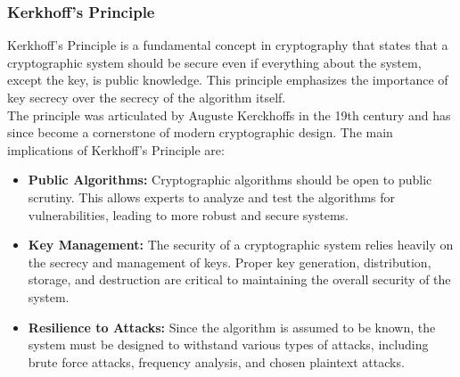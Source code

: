 \documentclass[openany]{book}
\begin{document}
\subsubsection{Kerkhoff's Principle}
Kerkhoff's Principle is a fundamental concept in cryptography that states that a cryptographic system should be secure even if everything about the system, except the key, is public knowledge. This principle emphasizes the importance of key secrecy over the secrecy of the algorithm itself. \\
The principle was articulated by Auguste Kerckhoffs in the 19th century and has since become a cornerstone of modern cryptographic design. The main implications of Kerkhoff's Principle are:
\begin{itemize}
    \item \textbf{Public Algorithms:} Cryptographic algorithms should be open to public scrutiny. This allows experts to analyze and test the algorithms for vulnerabilities, leading to more robust and secure systems.
    \item \textbf{Key Management:} The security of a cryptographic system relies heavily on the secrecy and management of keys. Proper key generation, distribution, storage, and destruction are critical to maintaining the overall security of the system.
    \item \textbf{Resilience to Attacks:} Since the algorithm is assumed to be known, the system must be designed to withstand various types of attacks, including brute force attacks, frequency analysis, and chosen plaintext attacks.
\end{itemize}
\end{document}
